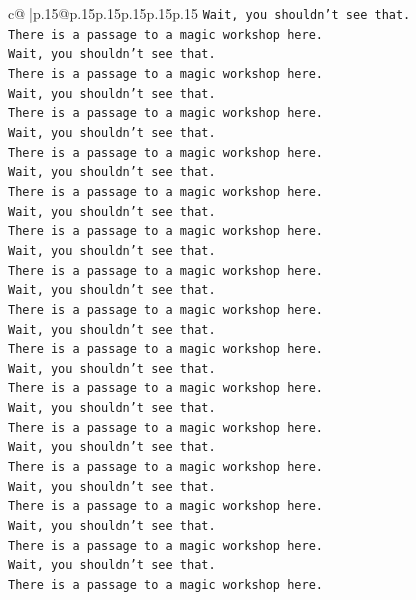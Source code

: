\documentclass{article}
\begin{document}
{\begin{supertabular}{c@{$\;$}|p{.15\linewidth}@{}p{.15\linewidth}p{.15\linewidth}p{.15\linewidth}p{.15\linewidth}p{.15\linewidth}}
{{{\texttt{Wait, you shouldn't see that.} \\
\texttt{There is a passage to a magic workshop here.} \\
\texttt{Wait, you shouldn't see that.} \\
\texttt{There is a passage to a magic workshop here.} \\
\texttt{Wait, you shouldn't see that.} \\
\texttt{There is a passage to a magic workshop here.} \\
\texttt{Wait, you shouldn't see that.} \\
\texttt{There is a passage to a magic workshop here.} \\
\texttt{Wait, you shouldn't see that.} \\
\texttt{There is a passage to a magic workshop here.} \\
\texttt{Wait, you shouldn't see that.} \\
\texttt{There is a passage to a magic workshop here.} \\
\texttt{Wait, you shouldn't see that.} \\
\texttt{There is a passage to a magic workshop here.} \\
\texttt{Wait, you shouldn't see that.} \\
\texttt{There is a passage to a magic workshop here.} \\
\texttt{Wait, you shouldn't see that.} \\
\texttt{There is a passage to a magic workshop here.} \\
\texttt{Wait, you shouldn't see that.} \\
\texttt{There is a passage to a magic workshop here.} \\
\texttt{Wait, you shouldn't see that.} \\
\texttt{There is a passage to a magic workshop here.} \\
\texttt{Wait, you shouldn't see that.} \\
\texttt{There is a passage to a magic workshop here.} \\
\texttt{Wait, you shouldn't see that.} \\
\texttt{There is a passage to a magic workshop here.} \\
\texttt{Wait, you shouldn't see that.} \\
\texttt{There is a passage to a magic workshop here.} \\
\texttt{Wait, you shouldn't see that.} \\
\texttt{There is a passage to a magic workshop here.} \\
}}}
\end{supertabular}}
\end{document}
